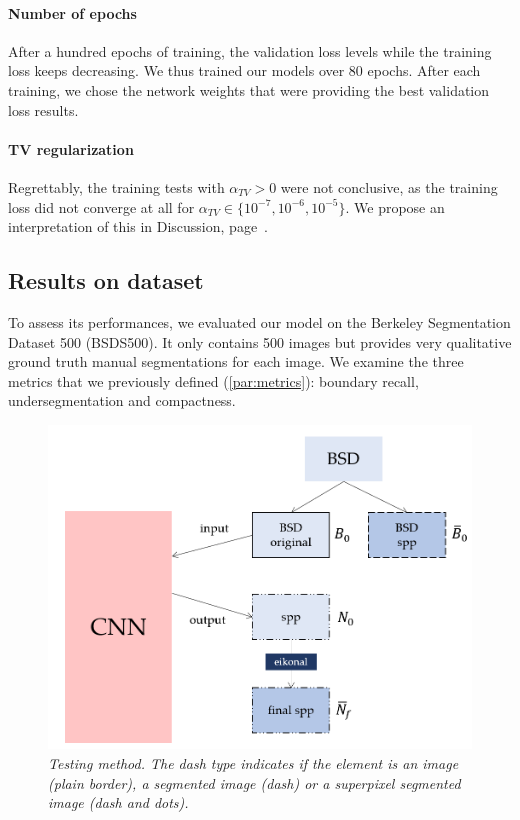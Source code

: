 \documentclass{article}
\begin{document}
        \paragraph{Number of epochs}
        After a hundred epochs of training, the validation loss levels while the training loss keeps decreasing. We thus trained our models over 80 epochs. After each training, we chose the network weights that were providing the best validation loss results.

        \paragraph{TV regularization}
        Regrettably, the training tests with $\alpha_{TV}>0$ were not conclusive, as the training loss did not converge at all for $\alpha_{TV}\in \{10^{-7}, 10^{-6}, 10^{-5}\}$. We propose an interpretation of this in Discussion, page~\pageref{s5}.

    \subsection{Results on dataset}
        To assess its performances, we evaluated our model on the Berkeley Segmentation Dataset 500 (BSDS500)\cite{arbelaez2011}. It only contains 500 images but provides very qualitative ground truth manual segmentations for each image. We examine the three metrics that we previously defined (\ref{par:metrics}): boundary recall, undersegmentation and compactness.

        \begin{figure}[!ht]
            \centering
            \includegraphics[width=.7\linewidth]{pics/schema-test.png}
            \caption{\textit{Testing method. The dash type indicates if the element is an image (plain border), a segmented image (dash) or a superpixel segmented image (dash and dots).}}
        \end{figure}
\end{document}
